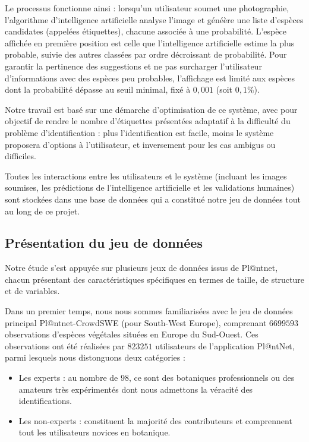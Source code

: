 \documentclass[a4paper,12pt]{article}
\begin{document}
Le processus fonctionne ainsi : lorsqu'un utilisateur soumet une photographie, l'algorithme d'intelligence artificielle analyse l'image et généère une liste d'espèces candidates (appelées étiquettes), chacune associée à une probabilité. L'espèce affichée en première position est celle que l'intelligence artificielle estime la plus probable, suivie des autres classées par ordre décroissant de probabilité. Pour garantir la pertinence des suggestions et ne pas surcharger l'utilisateur d'informations avec des espèces peu probables, l'affichage est limité aux espèces dont la probabilité dépasse au seuil minimal, fixé à $0,001$ (soit $0,1\%$).

\vspace{0.2cm}


Notre travail est basé sur une démarche d'optimisation de ce système, avec pour objectif de rendre le nombre d'étiquettes présentées adaptatif à la difficulté du problème d'identification : plus l'identification est facile, moins le système proposera d'options à l'utilisateur, et inversement pour les cas ambigus ou difficiles.

\vspace{0.2cm}

Toutes les interactions entre les utilisateurs et le système (incluant les images soumises, les prédictions de l'intelligence artificielle et les validations humaines) sont stockées dans une base de données qui a constitué notre jeu de données tout au long de ce projet.


\subsection{Présentation du jeu de données}

Notre étude s'est appuyée sur plusieurs jeux de données issus de Pl@ntnet, chacun présentant des caractéristiques spécifiques en termes de taille, de structure et de variables.

\vspace{0.2cm}

Dans un premier temps, nous nous sommes familiarisées avec le jeu de données principal Pl@ntnet-CrowdSWE (pour South-West Europe), comprenant $6 699 593$ observations d'espèces végétales situées en Europe du Sud-Ouest. Ces observations ont été réalisées par $823 251$ utilisateurs de l'application Pl@ntNet, parmi lesquels nous distonguons deux catégories : 
\begin{itemize}
    \item Les experts : au nombre de $98$, ce sont des botaniques professionnels ou des amateurs très expérimentés dont nous admettons la véracité des identifications.
    \item Les non-experts : constituent la majorité des contributeurs et comprennent tout les utilisateurs novices en botanique.
\end{itemize}
\end{document}
